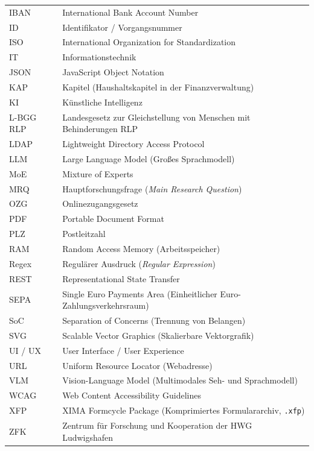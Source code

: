 \documentclass[
    12pt,
    a4paper,
    ngerman,
    oneside,
    parskip=half,
    listof=totoc,
    bibliography=totoc
]{scrreprt}
\begin{document}
\begin{xltabular}{\textwidth}{p{3.2cm}X}
IBAN & International Bank Account Number \\
ID & Identifikator / Vorgangsnummer \\
ISO & International Organization for Standardization \\
IT & Informationstechnik \\
JSON & JavaScript Object Notation \\
KAP & Kapitel (Haushaltskapitel in der Finanzverwaltung) \\
KI & Künstliche Intelligenz \\
L-BGG RLP & Landesgesetz zur Gleichstellung von Menschen mit Behinderungen RLP \\
LDAP & Lightweight Directory Access Protocol \\
LLM & Large Language Model (Großes Sprachmodell) \\
MoE & Mixture of Experts \\
MRQ & Hauptforschungsfrage (\textit{Main Research Question}) \\
OZG & Onlinezugangsgesetz \\
PDF & Portable Document Format \\
PLZ & Postleitzahl \\
RAM & Random Access Memory (Arbeitsspeicher) \\
Regex & Regulärer Ausdruck (\textit{Regular Expression}) \\
REST & Representational State Transfer \\
SEPA & Single Euro Payments Area (Einheitlicher Euro-Zahlungsverkehrsraum) \\
SoC & Separation of Concerns (Trennung von Belangen) \\
SVG & Scalable Vector Graphics (Skalierbare Vektorgrafik) \\
UI / UX & User Interface / User Experience \\
URL & Uniform Resource Locator (Webadresse) \\
VLM & Vision-Language Model (Multimodales Seh- und Sprachmodell) \\
WCAG & Web Content Accessibility Guidelines \\
XFP & XIMA Formcycle Package (Komprimiertes Formulararchiv, \texttt{.xfp}) \\
ZFK & Zentrum für Forschung und Kooperation der HWG Ludwigshafen \\
\bottomrule
\end{xltabular}
\clearpage

\end{document}
